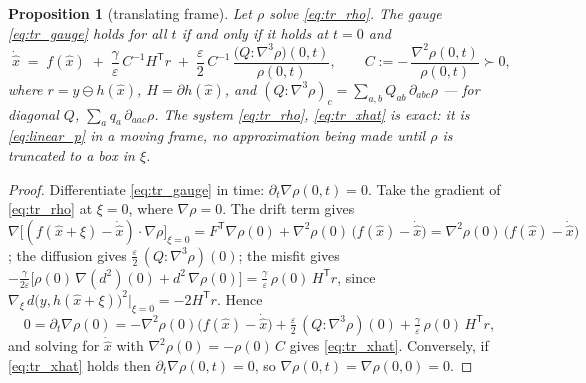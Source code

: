 \documentclass[11pt,a4paper]{article}
\newcommand{\T}{^{\mathsf T}}
\newcommand{\xh}{\hat{x}}
\newcommand{\eps}{\varepsilon}
\newcommand{\grad}{\nabla}
\theoremstyle{plain}
\newtheorem{proposition}{Proposition}
\theoremstyle{definition}
\theoremstyle{remark}
\begin{document}
\begin{proposition}[translating frame]
\label{prop:tr}
Let $\rho$ solve \eqref{eq:tr_rho}. The gauge \eqref{eq:tr_gauge} holds for all $t$ if and only if it holds at $t=0$ and
\begin{equation}
  \boxed{\;
  \dot{\xh} \;=\; f(\xh) \;+\; \frac{\gamma}{\eps}\,C^{-1}H\T r \;+\; \frac\eps2\,C^{-1}\,\frac{\big(Q\!:\!\grad^3\rho\big)(0,t)}{\rho(0,t)},
  \qquad C := -\,\frac{\grad^2\rho(0,t)}{\rho(0,t)} \succ 0,\;}
  \label{eq:tr_xhat}
\end{equation}
where $r = y\ominus h(\xh)$, $H=\partial h(\xh)$, and $(Q\!:\!\grad^3\rho)_c = \sum_{a,b}Q_{ab}\,\partial_{abc}\rho$ --- for diagonal $Q$, $\sum_aq_a\,\partial_{aac}\rho$. The system \eqref{eq:tr_rho}, \eqref{eq:tr_xhat} is exact: it is \eqref{eq:linear_p} in a moving frame, no approximation being made until $\rho$ is truncated to a box in $\xi$.
\end{proposition}
\begin{proof}
Differentiate \eqref{eq:tr_gauge} in time: $\partial_t\grad\rho(0,t)=0$. Take the gradient of \eqref{eq:tr_rho} at $\xi=0$, where $\grad\rho=0$. The drift term gives $\grad\big[(f(\xh+\xi)-\dot{\xh})\cdot\grad\rho\big]_{\xi=0} = F\T\grad\rho(0) + \grad^2\rho(0)\,\big(f(\xh)-\dot{\xh}\big) = \grad^2\rho(0)\,\big(f(\xh)-\dot{\xh}\big)$; the diffusion gives $\tfrac\eps2\,(Q\!:\!\grad^3\rho)(0)$; the misfit gives $-\tfrac{\gamma}{2\eps}\big[\rho(0)\,\grad(d^2)(0) + d^2\,\grad\rho(0)\big] = \tfrac\gamma\eps\,\rho(0)\,H\T r$, since $\grad_\xi\,d\big(y,h(\xh+\xi)\big)^2\big|_{\xi=0} = -2H\T r$. Hence
\[
  0 = \partial_t\grad\rho(0) = -\grad^2\rho(0)\big(f(\xh)-\dot{\xh}\big) + \tfrac\eps2\,(Q\!:\!\grad^3\rho)(0) + \tfrac\gamma\eps\,\rho(0)\,H\T r ,
\]
and solving for $\dot{\xh}$ with $\grad^2\rho(0) = -\rho(0)\,C$ gives \eqref{eq:tr_xhat}. Conversely, if \eqref{eq:tr_xhat} holds then $\partial_t\grad\rho(0,t)=0$, so $\grad\rho(0,t)=\grad\rho(0,0)=0$.
\end{proof}
\end{document}
